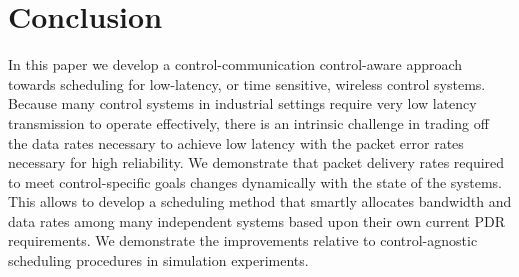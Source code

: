 \documentclass{article}
\begin{document}
 
 \section{Conclusion}
In this paper we develop a control-communication control-aware approach towards scheduling for low-latency, or time sensitive, wireless control systems. Because many control systems in industrial settings require very low latency transmission to operate effectively, there is an intrinsic challenge in trading off the data rates necessary to achieve low latency with the packet error rates necessary for high reliability. We demonstrate that packet delivery rates required to meet control-specific goals changes dynamically with the state of the systems. This allows to develop a scheduling method that smartly allocates bandwidth and data rates among many independent systems based upon their own current PDR requirements. We demonstrate the improvements relative to control-agnostic scheduling procedures in simulation experiments.


\newpage 


\end{document}
